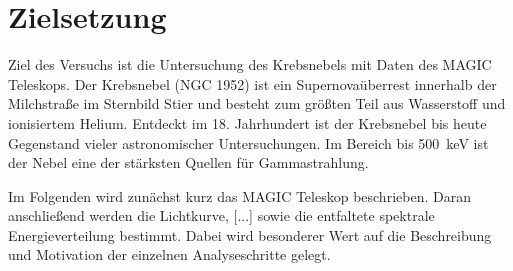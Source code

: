 \section{Zielsetzung}
\label{sec:zielsetzung}

Ziel des Versuchs ist die Untersuchung des Krebsnebels mit Daten des MAGIC
Teleskops. Der Krebsnebel (NGC 1952) ist ein Supernovaüberrest innerhalb der
Milchstraße im Sternbild Stier und besteht zum größten Teil aus Wasserstoff und
ionisiertem Helium. Entdeckt im 18. Jahrhundert ist der Krebsnebel bis heute
Gegenstand vieler astronomischer Untersuchungen. Im Bereich bis
\SI{500}{\kilo\electronvolt} ist der Nebel eine der stärksten Quellen für
Gammastrahlung.

Im Folgenden wird zunächst kurz das MAGIC Teleskop beschrieben. Daran
anschließend werden die Lichtkurve, [...] sowie die entfaltete spektrale
Energieverteilung bestimmt. Dabei wird besonderer Wert auf die Beschreibung und
Motivation der einzelnen Analyseschritte gelegt.
